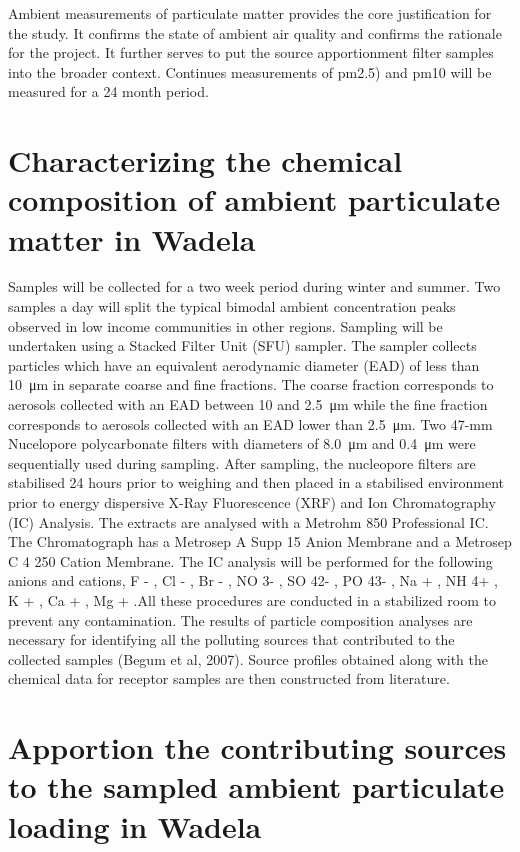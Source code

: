 \documentclass{nwureport}
\begin{document}
Ambient measurements of particulate matter provides the core justification for the study. It confirms the state
of ambient air quality and confirms the rationale for the project. It further serves to put the source
apportionment filter samples into the broader context. Continues measurements of \gls{pm2.5}) and \gls{pm10} will be measured for a 24 month period.

\section{Characterizing the chemical composition of ambient particulate matter in Wadela}

Samples will be collected for a two week period during winter and summer. Two samples a day will split the
typical bimodal ambient concentration peaks observed in low income communities in other regions. Sampling
will be undertaken using a Stacked Filter Unit (SFU) sampler. The sampler collects particles which have an
equivalent aerodynamic diameter (EAD) of less than \SI{10}{\micro\meter} in separate coarse and fine fractions. The
coarse fraction corresponds to aerosols collected with an EAD between \num{10} and \SI{2.5}{\micro\meter} while the fine fraction
corresponds to aerosols collected with an EAD lower than \SI{2.5}{\micro\meter}. Two 47-mm Nucelopore polycarbonate
filters with diameters of \SI{8.0}{\micro\meter} and \SI{0.4}{\micro\meter} were sequentially used during sampling.
After sampling, the nucleopore filters are stabilised 24 hours prior to weighing and then placed in a stabilised
environment prior to energy dispersive X-Ray Fluorescence (XRF) and Ion Chromatography (IC) Analysis.
The extracts are analysed with a Metrohm 850 Professional IC. The Chromatograph has a Metrosep A Supp
15 Anion Membrane and a Metrosep C 4 250 Cation Membrane. The IC analysis will be performed for the
following anions and cations, F - , Cl - , Br - , NO 3- , SO 42- , PO 43- , Na + , NH 4+ , K + , Ca + , Mg + .All these procedures are conducted in a stabilized room to prevent any contamination. The results of particle
composition analyses are necessary for identifying all the polluting sources that contributed to the collected
samples (Begum et al, 2007). Source profiles obtained along with the chemical data for receptor samples
are then constructed from literature.

\section{Apportion the contributing sources to the sampled ambient particulate loading in Wadela}
\end{document}
